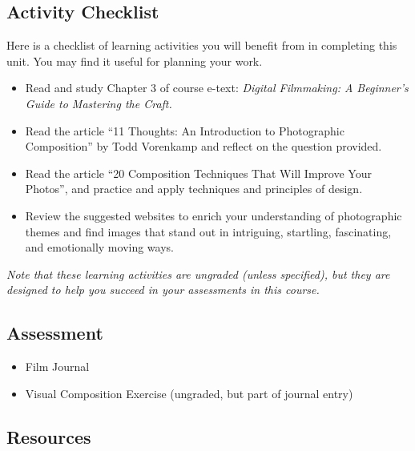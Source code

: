 \documentclass[
]{book}
\providecommand{\tightlist}{%
  \setlength{\itemsep}{0pt}\setlength{\parskip}{0pt}}
\begin{document}
\hypertarget{activity-checklist-2}{%
\subsection*{Activity Checklist}\label{activity-checklist-2}}

\begin{reflect}
Here is a checklist of learning activities you will benefit from in completing this unit. You may find it useful for planning your work.

\begin{itemize}
\tightlist
\item
  Read and study Chapter 3 of course e-text: \emph{Digital Filmmaking: A Beginner's Guide to Mastering the Craft.}
\item
  Read the article ``11 Thoughts: An Introduction to Photographic Composition'' by Todd Vorenkamp and reflect on the question provided.
\item
  Read the article ``20 Composition Techniques That Will Improve Your Photos'', and practice and apply techniques and principles of design.
\item
  Review the suggested websites to enrich your understanding of photographic themes and find images that stand out in intriguing, startling, fascinating, and emotionally moving ways.
\end{itemize}

\emph{Note that these learning activities are ungraded (unless specified), but they are designed to help you succeed in your assessments in this course.}
\end{reflect}

\hypertarget{assessment-4}{%
\subsection{Assessment}\label{assessment-4}}

\begin{itemize}
\tightlist
\item
  Film Journal\\
\item
  Visual Composition Exercise (ungraded, but part of journal entry)
\end{itemize}

\hypertarget{resources-2}{%
\subsection*{Resources}\label{resources-2}}
\end{document}
